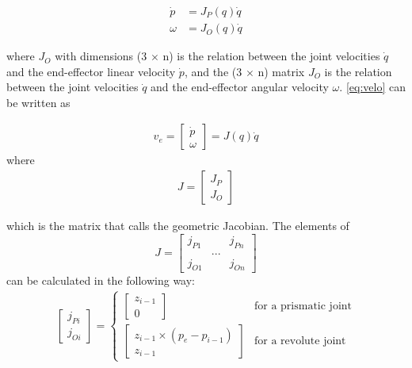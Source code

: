 \begin{equation}
    \begin{aligned}\label{eq:velo}
        \dot{p} &= J_P(q)\dot{q}\\
        \omega&= J_O(q)\dot{q}
    \end{aligned}
\end{equation}

where $J_O$ with dimensions (3 $\times$ n) is the relation between the joint velocities $\dot{q}$ and the end-effector linear velocity $\dot{p}$, and the (3 $\times$ n) matrix $J_O$ is the relation between the joint velocities $\dot{q}$ and the end-effector angular velocity $\omega$. \eqref{eq:velo} can be written as

\begin{align*}
    v_e = 
    \begin{bmatrix}
        \dot{p} \\ \omega
    \end{bmatrix}
    = J(q)\dot{q}
\end{align*}
where
\begin{align*}
    J = 
    \begin{bmatrix}
        J_P \\ J_O
    \end{bmatrix}
\end{align*}

which is the matrix that \cite{Siciliano} calls the geometric Jacobian. The elements of 
$$
J = 
\begin{bmatrix}
    j_{P1} & & j_{Pn}\\
    &...&\\
    j_{O1} & & j_{On}
\end{bmatrix}
$$
can be calculated in the following way:
\begin{align*}
    \begin{bmatrix}
        j_{Pi}\\j_{Oi}
    \end{bmatrix}
    =
    \begin{cases}
        \begin{bmatrix} z_{i-1}\\ 0 \end{bmatrix} & \text{for a prismatic joint}\\
        \begin{bmatrix} z_{i-1} \times (p_e-p_{i-1}) \\ z_{i-1} \end{bmatrix} & \text{for a revolute joint}
    \end{cases}
\end{align*}

